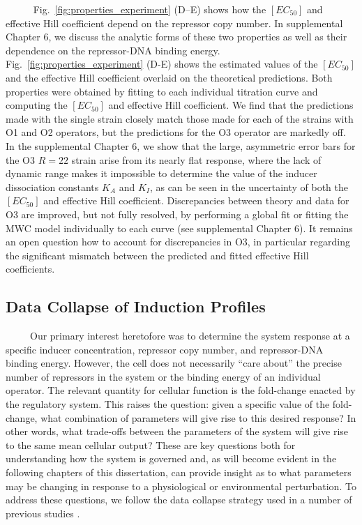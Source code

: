 \documentclass[12pt]{caltech_thesis}
\begin{document}
~~~~~ Fig.~\ref{fig:properties_experiment} (D--E) shows how the
\([EC_{50}]\) and effective Hill coefficient depend on the repressor
copy number. In supplemental Chapter 6, we discuss the analytic forms of
these two properties as well as their dependence on the repressor-DNA
binding energy. Fig.~\ref{fig:properties_experiment} (D-E) shows the
estimated values of the \([EC_{50}]\) and the effective Hill coefficient
overlaid on the theoretical predictions. Both properties were obtained
by fitting to each individual titration curve and computing the
\([EC_{50}]\) and effective Hill coefficient. We find that the
predictions made with the single strain closely match those made for
each of the strains with O1 and O2 operators, but the predictions for
the O3 operator are markedly off. In the supplemental Chapter 6, we show
that the large, asymmetric error bars for the O3 \(R=22\) strain arise
from its nearly flat response, where the lack of dynamic range makes it
impossible to determine the value of the inducer dissociation constants
\(K_A\) and \(K_I\), as can be seen in the uncertainty of both the
\([EC_{50}]\) and effective Hill coefficient. Discrepancies between
theory and data for O3 are improved, but not fully resolved, by
performing a global fit or fitting the MWC model individually to each
curve (see supplemental Chapter 6). It remains an open question how to
account for discrepancies in O3, in particular regarding the significant
mismatch between the predicted and fitted effective Hill coefficients.

\hypertarget{data-collapse-of-induction-profiles}{%
\subsection{Data Collapse of Induction
Profiles}\label{data-collapse-of-induction-profiles}}

~~~~~Our primary interest heretofore was to determine the system
response at a specific inducer concentration, repressor copy number, and
repressor-DNA binding energy. However, the cell does not necessarily
``care about'' the precise number of repressors in the system or the
binding energy of an individual operator. The relevant quantity for
cellular function is the fold-change enacted by the regulatory system.
This raises the question: given a specific value of the fold-change,
what combination of parameters will give rise to this desired response?
In other words, what trade-offs between the parameters of the system
will give rise to the same mean cellular output? These are key questions
both for understanding how the system is governed and, as will become
evident in the following chapters of this dissertation, can provide
insight as to what parameters may be changing in response to a
physiological or environmental perturbation. To address these questions,
we follow the data collapse strategy used in a number of previous
studies \autocite{sourjik2002b,keymer2006,swem2008}.
\end{document}

